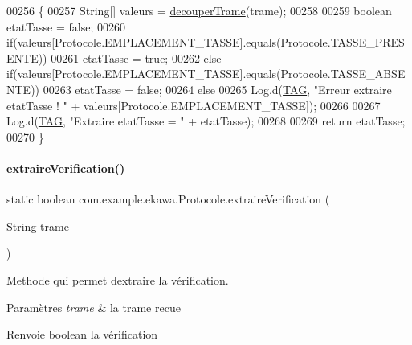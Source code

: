 \begin{DoxyCode}
00256     \{
00257         String[] valeurs = \hyperlink{classcom_1_1example_1_1ekawa_1_1_protocole_a23c261e4ab5ad3c2ac60187f04ae40ea}{decouperTrame}(trame);
00258 
00259         \textcolor{keywordtype}{boolean} etatTasse = \textcolor{keyword}{false};
00260         \textcolor{keywordflow}{if}(valeurs[Protocole.EMPLACEMENT\_TASSE].equals(Protocole.TASSE\_PRESENTE))
00261             etatTasse = \textcolor{keyword}{true};
00262         \textcolor{keywordflow}{else} \textcolor{keywordflow}{if}(valeurs[Protocole.EMPLACEMENT\_TASSE].equals(Protocole.TASSE\_ABSENTE))
00263             etatTasse = \textcolor{keyword}{false};
00264         \textcolor{keywordflow}{else}
00265             Log.d(\hyperlink{classcom_1_1example_1_1ekawa_1_1_protocole_ae9b68fa0daac528421b887f19413f8f5}{TAG}, \textcolor{stringliteral}{"Erreur extraire etatTasse ! "} + valeurs[Protocole.EMPLACEMENT\_TASSE]);
00266 
00267         Log.d(\hyperlink{classcom_1_1example_1_1ekawa_1_1_protocole_ae9b68fa0daac528421b887f19413f8f5}{TAG}, \textcolor{stringliteral}{"Extraire etatTasse = "} + etatTasse);
00268 
00269         \textcolor{keywordflow}{return} etatTasse;
00270     \}
\end{DoxyCode}
\mbox{\label{classcom_1_1example_1_1ekawa_1_1_protocole_add9d5727209d29af21fa468e6929fe0b}} 
\paragraph{\texorpdfstring{extraire\+Verification()}{extraireVerification()}}
{\footnotesize\ttfamily static boolean com.\+example.\+ekawa.\+Protocole.\+extraire\+Verification (\begin{DoxyParamCaption}\item[{String}]{trame }\end{DoxyParamCaption})\hspace{0.3cm}{\ttfamily [static]}}



Methode qui permet d\textquotesingle{}extraire la vérification. 


\begin{DoxyParams}{Paramètres}
{\em trame} & la trame recue \\
\hline
\end{DoxyParams}
\begin{DoxyReturn}{Renvoie}
boolean la vérification 
\end{DoxyReturn}


